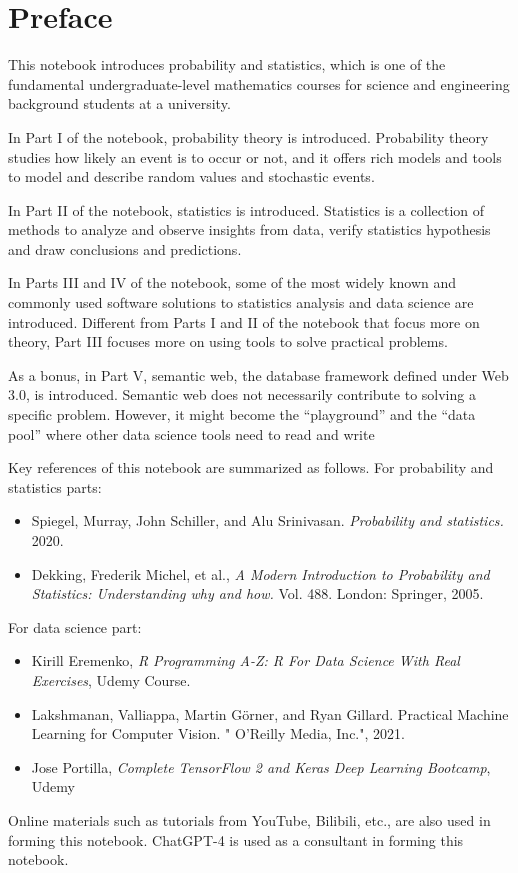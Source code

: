 \chapter*{Preface}

This notebook introduces probability and statistics, which is one of the fundamental undergraduate-level mathematics courses for science and engineering background students at a university.

In Part I of the notebook, probability theory is introduced. Probability theory studies how likely an event is to occur or not, and it offers rich models and tools to model and describe random values and stochastic events.

In Part II of the notebook, statistics is introduced. Statistics is a collection of methods to analyze and observe insights from data, verify statistics hypothesis and draw conclusions and predictions.

In Parts III and IV of the notebook, some of the most widely known and commonly used software solutions to statistics analysis and data science are introduced. Different from Parts I and II of the notebook that focus more on theory, Part III focuses more on using tools to solve practical problems.

As a bonus, in Part V, semantic web, the database framework defined under Web 3.0, is introduced. Semantic web does not necessarily contribute to solving a specific problem. However, it might become the ``playground'' and the ``data pool'' where other data science tools need to read and write  

Key references of this notebook are summarized as follows. For probability and statistics parts:
\begin{itemize}
  \item Spiegel, Murray, John Schiller, and Alu Srinivasan. \textit{Probability and statistics.} 2020.
  \item Dekking, Frederik Michel, et al., \textit{A Modern Introduction to Probability and Statistics: Understanding why and how.} Vol. 488. London: Springer, 2005.
\end{itemize}
For data science part:
\begin{itemize}
  \item Kirill Eremenko, \textit{R Programming A-Z: R For Data Science With Real Exercises}, Udemy Course.
  \item Lakshmanan, Valliappa, Martin Görner, and Ryan Gillard. Practical Machine Learning for Computer Vision. " O'Reilly Media, Inc.", 2021.
  \item Jose Portilla, \textit{Complete TensorFlow 2 and Keras Deep Learning Bootcamp}, Udemy
\end{itemize} 

Online materials such as tutorials from YouTube, Bilibili, etc., are also used in forming this notebook. ChatGPT-4 is used as a consultant in forming this notebook. 